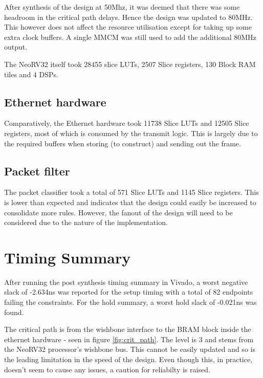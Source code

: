 After synthesis of the design at 50Mhz, it was deemed that there was some headroom in the critical path delays. Hence the design was updated to 80MHz. This however does not affect the resource utilisation except for taking up some extra clock buffers. A single MMCM was still used to add the additional 80MHz output. 

The NeoRV32 itself took 28455 slice LUTs, 2507 Slice registers, 130 Block RAM tiles and 4 DSPs. 


\subsection{Ethernet hardware}
Comparatively, the Ethernet hardware took 11738 Slice LUTs and 12505 Slice registers, most of which is consumed by the transmit logic. This is largely due to the required buffers when storing (to construct) and sending out the frame. 

\subsection{Packet filter}
The packet classifier took a total of 571 Slice LUTs and 1145 Slice registers. This is lower than expected and indicates that the design could easily be increased to consolidate more rules. However, the fanout of the design will need to be considered due to the nature of the implementation. 





\section{Timing Summary}
\label{sec:timing_summary}
After running the post synthesis timing summary in Vivado, a worst negative slack of -2.634ns was reported for the setup timing with a total of 82 endpoints failing the constraints. For the hold summary, a worst hold slack of -0.021ns was found. 

The critical path is from the wishbone interface to the BRAM block inside the ethernet hardware - seen in figure \ref{fig:crit_path}. The level is 3 and stems from the NeoRV32 processor's wishbone bus. This cannot be easily updated and so is the leading limitation in the speed of the design. Even though this, in practice, doesn't seem to cause any issues, a caution for reliabilty is raised. 

